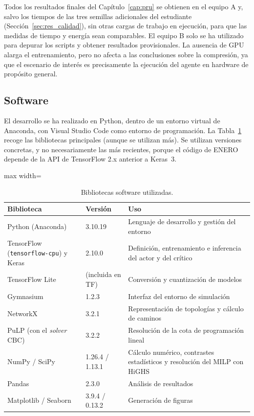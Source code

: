Todos los resultados finales del Capítulo~\ref{cap:pru} se obtienen en el equipo A y, salvo los tiempos de las tres semillas adicionales del estudiante (Sección~\ref{sec:res_calidad}), sin otras cargas de trabajo en ejecución, para que las medidas de tiempo y energía sean comparables. El equipo B solo se ha utilizado para depurar los scripts y obtener resultados provisionales. La ausencia de GPU alarga el entrenamiento, pero no afecta a las conclusiones sobre la compresión, ya que el escenario de interés es precisamente la ejecución del agente en hardware de propósito general.

\subsection{Software}\label{sec:software}

El desarrollo se ha realizado en Python, dentro de un entorno virtual de Anaconda, con Visual Studio Code como entorno de programación. La Tabla~\ref{tab:software} recoge las bibliotecas principales (aunque se utilizan más). Se utilizan versiones concretas, y no necesariamente las más recientes, porque el código de ENERO depende de la API de TensorFlow 2.x anterior a Keras~3.

\begin{table}[H]
	\centering
	\small
	\begin{adjustbox}{max width=\textwidth}
	\begin{tabular}{p{4.2cm}p{2.2cm}p{6.2cm}}
		\toprule
		\textbf{Biblioteca} & \textbf{Versión} & \textbf{Uso} \\
		\midrule
		Python (Anaconda) & 3.10.19 & Lenguaje de desarrollo y gestión del entorno \\
		TensorFlow (\texttt{tensorflow-cpu}) y Keras & 2.10.0 & Definición, entrenamiento e inferencia del actor y del crítico \\
		TensorFlow Lite & (incluida en TF) & Conversión y cuantización de modelos \\
		Gymnasium & 1.2.3 & Interfaz del entorno de simulación \\
		NetworkX & 3.2.1 & Representación de topologías y cálculo de caminos \\
		PuLP (con el \textit{solver} CBC) & 3.2.2 & Resolución de la cota de programación lineal \\
		NumPy / SciPy & 1.26.4 / 1.13.1 & Cálculo numérico, contrastes estadísticos y resolución del MILP con HiGHS \cite{virtanen2020scipy,huangfu2018parallelizing} \\
		Pandas & 2.3.0 & Análisis de resultados \\
		Matplotlib / Seaborn & 3.9.4 / 0.13.2 & Generación de figuras \\
		\bottomrule
	\end{tabular}
	\end{adjustbox}
	\caption{Bibliotecas software utilizadas.}
	\label{tab:software}
\end{table}

